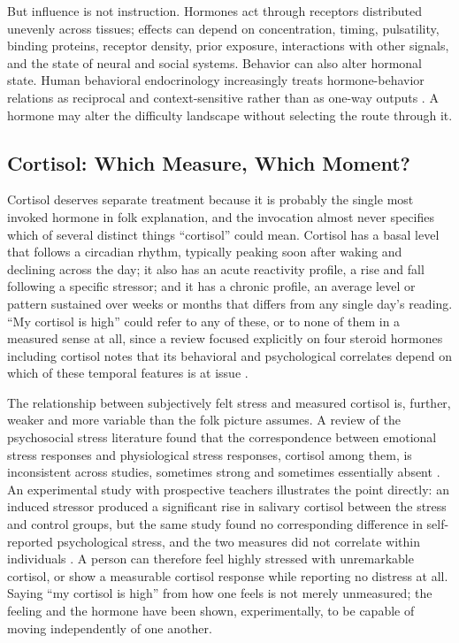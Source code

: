 \documentclass[11pt]{article}
\begin{document}
But influence is not instruction. Hormones act through receptors distributed unevenly across tissues; effects can depend on concentration, timing, pulsatility, binding proteins, receptor density, prior exposure, interactions with other signals, and the state of neural and social systems. Behavior can also alter hormonal state. Human behavioral endocrinology increasingly treats hormone-behavior relations as reciprocal and context-sensitive rather than as one-way outputs 
\citep{roney2016frameworks,knack2024behavioral}. A hormone may alter the difficulty landscape without selecting the route through it.

\subsection{Cortisol: Which Measure, Which Moment?}

Cortisol deserves separate treatment because it is probably the single most invoked hormone in folk explanation, and the invocation almost never specifies which of several distinct things ``cortisol'' could mean. Cortisol has a basal level that follows a circadian rhythm, typically peaking soon after waking and declining across the day; it also has an acute reactivity profile, a rise and fall following a specific stressor; and it has a chronic profile, an average level or pattern sustained over weeks or months that differs from any single day's reading. ``My cortisol is high'' could refer to any of these, or to none of them in a measured sense at all, since a review focused explicitly on four steroid hormones including cortisol notes that its behavioral and psychological correlates depend on which of these temporal features is at issue \citep{knack2024behavioral}.

The relationship between subjectively felt stress and measured cortisol is, further, weaker and more variable than the folk picture assumes. A review of the psychosocial stress literature found that the correspondence between emotional stress responses and physiological stress responses, cortisol among them, is inconsistent across studies, sometimes strong and sometimes essentially absent \citep{campbell2012psychological}. An experimental study with prospective teachers illustrates the point directly: an induced stressor produced a significant rise in salivary cortisol between the stress and control groups, but the same study found no corresponding difference in self-reported psychological stress, and the two measures did not correlate within individuals \citep{becker2023stress}. A person can therefore feel highly stressed with unremarkable cortisol, or show a measurable cortisol response while reporting no distress at all. Saying ``my cortisol is high'' from how one feels is not merely unmeasured; the feeling and the hormone have been shown, experimentally, to be capable of moving independently of one another.
\end{document}
